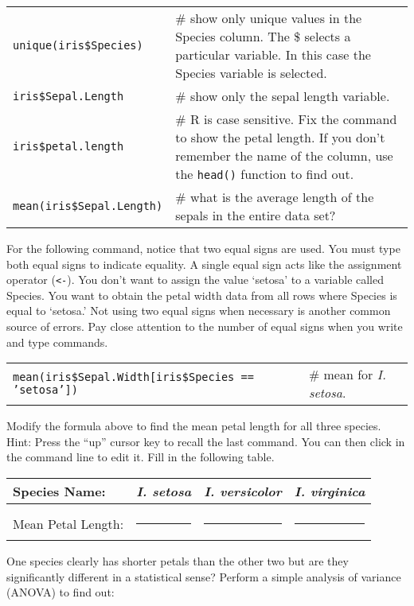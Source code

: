 \documentclass[11pt]{article}
\begin{document}
\begin{tabular}{@{}L{1.75in}L{3.75in}@{}}
\texttt{unique(iris\$Species)} & \# show only unique values in the Species column. The \$ selects a particular variable. In this case the Species variable is selected.\\

\texttt{iris\$Sepal.Length} & \# show only the sepal length variable.\\

\texttt{iris\$petal.length} & \# R is case sensitive. Fix the command to show the
petal length. If you don't remember the name of the column, use the \texttt{head()} function to find out.\\

\texttt{mean(iris\$Sepal.Length)} & \# what is the average length of the sepals in
the entire data set?\\

\end{tabular}

For the following command, notice that two equal signs are used. You must type 
both equal signs to indicate equality. A single equal sign
acts like the assignment operator (\texttt{\textless{}-}). You don't want to
assign the value `setosa' to a variable called Species. You want to
obtain the petal width data from all rows where Species is equal to
`setosa.' Not using two equal signs when necessary is another common
source of errors. Pay close attention to the number of equal signs when
you write and type commands. 

\begin{tabular}{@{}L{3.5in}L{2in}@{}}
\texttt{mean(iris\$Sepal.Width{[}iris\$Species == 'setosa'{]})} & \# mean for
\emph{I. setosa}. 
\end{tabular}

Modify the formula above to  find the mean petal length for all three species. Hint: Press the ``up'' cursor key to recall the last command. You can then click in the command line to edit it. Fill in the following table.


\begin{longtable}[l]{@{}lccc@{}}
\toprule
Species Name: & \emph{I. setosa} & \emph{I. versicolor} & \emph{I.
virginica}\tabularnewline
\midrule
&&&\tabularnewline[1ex]
Mean Petal Length: & \rule{1in}{0.4pt} & \rule{1in}{0.4pt}  & \rule{1in}{0.4pt} \tabularnewline
\bottomrule
\end{longtable}

One species clearly has shorter petals than the other two but are they
significantly different in a statistical sense? Perform a simple
analysis of variance (ANOVA) to find out:
\end{document}
